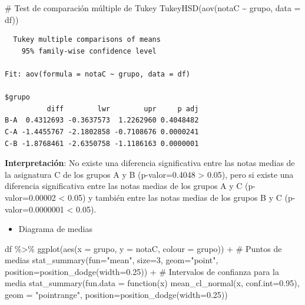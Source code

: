 \documentclass[
  a4paper,
]{scrreport}
\newenvironment{Shaded}{\begin{snugshade}}{\end{snugshade}}
\newcommand{\AttributeTok}[1]{\textcolor[rgb]{0.40,0.45,0.13}{#1}}
\newcommand{\CommentTok}[1]{\textcolor[rgb]{0.37,0.37,0.37}{#1}}
\newcommand{\ControlFlowTok}[1]{\textcolor[rgb]{0.00,0.23,0.31}{#1}}
\newcommand{\DecValTok}[1]{\textcolor[rgb]{0.68,0.00,0.00}{#1}}
\newcommand{\FloatTok}[1]{\textcolor[rgb]{0.68,0.00,0.00}{#1}}
\newcommand{\FunctionTok}[1]{\textcolor[rgb]{0.28,0.35,0.67}{#1}}
\newcommand{\NormalTok}[1]{\textcolor[rgb]{0.00,0.23,0.31}{#1}}
\newcommand{\SpecialCharTok}[1]{\textcolor[rgb]{0.37,0.37,0.37}{#1}}
\newcommand{\StringTok}[1]{\textcolor[rgb]{0.13,0.47,0.30}{#1}}
\providecommand{\tightlist}{%
  \setlength{\itemsep}{0pt}\setlength{\parskip}{0pt}}\usepackage{longtable,booktabs,array}
\theoremstyle{definition}
\theoremstyle{definition}
\theoremstyle{remark}
\begin{document}
\begin{Shaded}
\begin{Highlighting}[]
\CommentTok{\# Test de comparación múltiple de Tukey}
\FunctionTok{TukeyHSD}\NormalTok{(}\FunctionTok{aov}\NormalTok{(notaC }\SpecialCharTok{\textasciitilde{}}\NormalTok{ grupo, }\AttributeTok{data =}\NormalTok{ df))}
\end{Highlighting}
\end{Shaded}

\begin{verbatim}
  Tukey multiple comparisons of means
    95% family-wise confidence level

Fit: aov(formula = notaC ~ grupo, data = df)

$grupo
          diff        lwr        upr     p adj
B-A  0.4312693 -0.3637573  1.2262960 0.4048482
C-A -1.4455767 -2.1802858 -0.7108676 0.0000241
C-B -1.8768461 -2.6350758 -1.1186163 0.0000001
\end{verbatim}

\textbf{Interpretación}: No existe una diferencia significativa entre
las notas medias de la asignatura C de los grupos A y B (p-valor=0.4048
\textgreater{} 0.05), pero si existe una diferencia significativa entre
las notas medias de los grupos A y C (p-valor=0.00002 \textless{} 0.05)
y también entre las notas medias de los grupos B y C (p-valor=0.0000001
\textless{} 0.05).

\begin{itemize}
\tightlist
\item
  Diagrama de medias
\end{itemize}

\begin{Shaded}
\begin{Highlighting}[]
\NormalTok{df }\SpecialCharTok{\%\textgreater{}\%} \FunctionTok{ggplot}\NormalTok{(}\FunctionTok{aes}\NormalTok{(}\AttributeTok{x =}\NormalTok{ grupo, }\AttributeTok{y =}\NormalTok{ notaC, }\AttributeTok{colour =}\NormalTok{ grupo)) }\SpecialCharTok{+} 
  \CommentTok{\# Puntos de medias}
  \FunctionTok{stat\_summary}\NormalTok{(}\AttributeTok{fun=}\StringTok{"mean"}\NormalTok{, }\AttributeTok{size=}\DecValTok{3}\NormalTok{,  }\AttributeTok{geom=}\StringTok{"point"}\NormalTok{, }\AttributeTok{position=}\FunctionTok{position\_dodge}\NormalTok{(}\AttributeTok{width=}\FloatTok{0.25}\NormalTok{)) }\SpecialCharTok{+} 
  \CommentTok{\# Intervalos de confianza para la media}
  \FunctionTok{stat\_summary}\NormalTok{(}\AttributeTok{fun.data =} \ControlFlowTok{function}\NormalTok{(x) }\FunctionTok{mean\_cl\_normal}\NormalTok{(x, }\AttributeTok{conf.int=}\FloatTok{0.95}\NormalTok{), }\AttributeTok{geom =} \StringTok{"pointrange"}\NormalTok{, }\AttributeTok{position=}\FunctionTok{position\_dodge}\NormalTok{(}\AttributeTok{width=}\FloatTok{0.25}\NormalTok{)) }
\end{Highlighting}
\end{Shaded}
\end{document}
